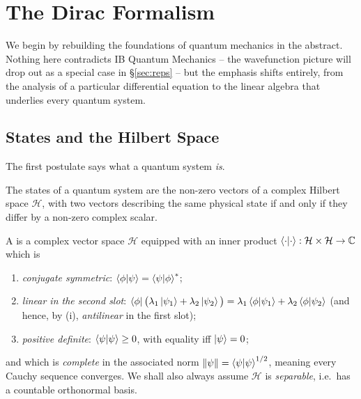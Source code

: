 \documentclass[a4paper]{scrartcl}
\begin{document}
\tableofcontents

\section{The Dirac Formalism}

We begin by rebuilding the foundations of quantum mechanics in the abstract. Nothing here contradicts IB Quantum Mechanics -- the wavefunction picture will drop out as a special case in \S\ref{sec:reps} -- but the emphasis shifts entirely, from the analysis of a particular differential equation to the linear algebra that underlies every quantum system.

\subsection{States and the Hilbert Space}

The first postulate says what a quantum system \emph{is}.

\begin{axiom}[States]
    The states of a quantum system are the non-zero vectors of a complex Hilbert space $\mathcal{H}$, with two vectors describing the same physical state if and only if they differ by a non-zero complex scalar.
\end{axiom}

A  is a complex vector space $\mathcal{H}$ equipped with an inner product $\braket{\cdot}{\cdot} : \mathcal{H} \times \mathcal{H} \to \mathbb{C}$ which is
\begin{enumerate}[label=(\roman*)]
    \item \emph{conjugate symmetric}: $\braket{\phi}{\psi} = \braket{\psi}{\phi}^*$;
    \item \emph{linear in the second slot}: $\bra{\phi}\big(\lambda_1 \ket{\psi_1} + \lambda_2 \ket{\psi_2}\big) = \lambda_1 \braket{\phi}{\psi_1} + \lambda_2\braket{\phi}{\psi_2}$ (and hence, by (i), \emph{antilinear} in the first slot);
    \item \emph{positive definite}: $\braket{\psi}{\psi} \geq 0$, with equality iff $\ket{\psi} = 0$;
\end{enumerate}
and which is \emph{complete} in the associated norm $\norm{\psi} = \braket{\psi}{\psi}^{1/2}$, meaning every Cauchy sequence converges. We shall also always assume $\mathcal{H}$ is \emph{separable}, i.e.\ has a countable orthonormal basis.
\end{document}
